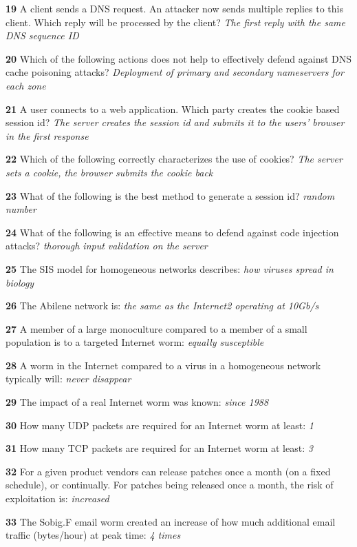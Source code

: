 \textbf{  19}  A client sends a DNS request. An attacker now sends multiple replies to this client. Which reply will be processed by the client? 
\textit{ The first reply with the same DNS sequence ID}

\textbf{  20}  Which of the following actions does not help to effectively defend against DNS cache poisoning attacks? 
\textit{ Deployment of primary and secondary nameservers for each zone}

\textbf{  21}  A user connects to a web application. Which party creates the cookie based session id?  
\textit{ The server creates the session id and submits it to the users' browser in the first response}

\textbf{  22}  Which of the following correctly characterizes the use of cookies?  
\textit{ The server sets a cookie, the browser submits the cookie back}

\textbf{  23}  What of the following is the best method to generate a session id?  
\textit{ random number}

\textbf{  24}  What of the following is an effective means to defend against code injection attacks?  
\textit{ thorough input validation on the server}

\textbf{  25}  The SIS model for homogeneous networks describes:  
\textit{ how viruses spread in biology}

\textbf{  26}  The Abilene network is:  
\textit{ the same as the Internet2 operating at 10Gb/s}

\textbf{  27}  A member of a large monoculture compared to a member of a small population is to a targeted Internet worm:  
\textit{ equally susceptible}

\textbf{  28}  A worm in the Internet compared to a virus in a homogeneous network typically will:  
\textit{ never disappear}

\textbf{  29}  The impact of a real Internet worm was known:  
\textit{ since 1988}

\textbf{  30}  How many UDP packets are required for an Internet worm at least:  
\textit{ 1}

\textbf{  31}  How many TCP packets are required for an Internet worm at least:  
\textit{ 3}

\textbf{  32}  For a given product vendors can release patches once a month (on a fixed schedule), or continually. For patches being released once a month, the risk of exploitation is: 
\textit{ increased}

\textbf{  33}  The Sobig.F email worm created an increase of how much additional email traffic (bytes/hour) at peak time: 
\textit{ 4 times}

